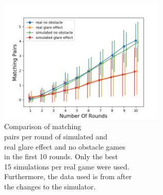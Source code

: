 \begin{minipage}{0.5\textwidth}
	\begin{figure}[H]
		\centering
		\includegraphics[width=8cm]{images/sd15x_10rounds/Figure_3.png}
		\caption[Comparison of matching pairs per round of simulated and real glare effect and no obstacle games in the first 10 rounds. Only the best 15 simulations per real game were used. Furthermore, the data used is from after the changes to the simulator.]{Comparison of matching \\\hspace{0\textwidth}pairs per round of simulated and\\\hspace{0\textwidth} real glare effect and no obstacle games\\\hspace{0\textwidth} in the first 10 rounds. Only the best \\\hspace{0\textwidth} 15 simulations per real game were used.\\\hspace{0\textwidth} Furthermore, the data used is from after\\\hspace{0\textwidth}the changes to the simulator.}
		\label{fig:simOp151}
	\end{figure}
\end{minipage}
